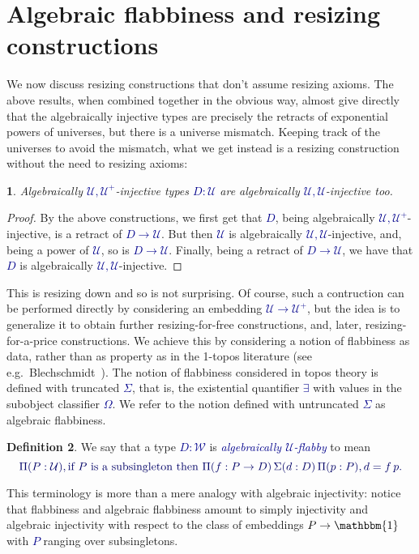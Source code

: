 \documentclass[10pt]{article}
\newcommand{\db}{\textcolor{darkblue}}
\newcommand{\df}[1]{\emph{\db{#1}}}
\newcommand{\m}[1]{\db{$#1$}}
\newcommand{\M}[1]{\[\db{#1}\]}
\newcommand{\U}{\mathcal{U}}
\newcommand{\W}{\mathcal{W}}
\newcommand{\One}{\mathbbm{1}}
\newtheorem{numbered}{}
\theoremstyle{definition}
\newtheorem{definition}[numbered]{Definition}
\begin{document}
\section{Algebraic flabbiness and resizing constructions}

We now discuss resizing constructions that don't assume resizing
axioms.  The above results, when combined together in the obvious way,
almost give directly that the algebraically injective types are
precisely the retracts of exponential powers of universes, but there
is a universe mismatch.  Keeping track of the universes to avoid the
mismatch, what we get instead is a resizing construction without the
need to resizing axioms:
\begin{numbered}
  Algebraically \m{\U,\U^+}-injective types \m{D:\U} are
  algebraically \m{\U,\U}-injective too.
\end{numbered}
\begin{proof}
By the above constructions, we
first get that \m{D}, being algebraically \m{\U,\U^+}-injective, is a
retract of \m{D \to \U}. But then \m{\U} is algebraically
\m{\U,\U}-injective, and, being a power of \m{\U}, so is \m{D \to \U}.
Finally, being a retract of \m{D \to \U}, we have that \m{D} is
algebraically \m{\U,\U}-injective.
\end{proof}
This is resizing down and so is not surprising.
%
Of course, such a contruction can be performed directly by considering
an embedding \m{\U \to \U^+}, but the idea is to generalize it to
obtain further resizing-for-free constructions, and, later,
resizing-for-a-price constructions.  We achieve this by considering a
notion of flabbiness as data, rather than as property as in the
1-topos literature (see e.g.\
Blechschmidt~\cite{Blechschmidt:2018}). The notion of flabbiness
considered in topos theory is defined with truncated \m{\Sigma}, that
is, the existential quantifier \m{\exists} with values in the
subobject classifier \m{\Omega}. We refer to the notion defined with
untruncated \m{\Sigma} as algebraic flabbiness.

\begin{definition}
  We say that a type \m{D : \W} is \df{algebraically \m{\U}-flabby} to mean
%
\M{
  \Pi (P : \U), \text{if \m{P} is a subsingleton then \m{\Pi(f : P \to D)\, \Sigma (d : D)\, \Pi(p : P), d = f \, p}.}
}
%
\end{definition}
\noindent This terminology is more than a mere analogy with
algebraic injectivity: notice that flabbiness and algebraic flabbiness
amount to simply injectivity and algebraic injectivity with respect to
the class of embeddings \m{P \to \One} with \m{P} ranging over
subsingletons.
\end{document}

